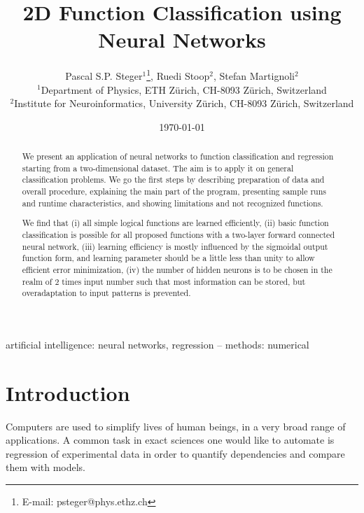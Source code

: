 \documentclass[useAMS,usenatbib]{templates/mn2e}
\begin{document}
%
\title[2D Function Classification using Neural Networks]
       {2D Function Classification using Neural Networks}
%
\author[P. Steger et al.]{Pascal S.P. Steger$^{1}$\thanks{E-mail: psteger@phys.ethz.ch},
  Ruedi Stoop$^{2}$,
  Stefan Martignoli$^{2}$\\
  $^{1}$Department of Physics,
  ETH Z\"urich,
  CH-8093 Z\"urich,
  Switzerland\\
  $^{2}$Institute for Neuroinformatics,
  University Z\"urich,
  CH-8093 Z\"urich,
  Switzerland
}
%
%
\date{\today}
\pagerange{\pageref{firstpage}--\pageref{lastpage}} 
\maketitle
\label{firstpage}
\begin{abstract}
  We present an application of neural networks to function
  classification and regression starting from a two-dimensional
  dataset. The aim is to apply it on general classification
  problems. We go the first steps by describing preparation of data
  and overall procedure, explaining the main part of the program,
  presenting sample runs and runtime characteristics, and showing
  limitations and not recognized functions.

  We find that (i) all simple logical functions are learned
  efficiently, (ii) basic function classification is possible for all
  proposed functions with a two-layer forward connected neural
  network, (iii) learning efficiency is mostly influenced by the
  sigmoidal output function form, and learning parameter should be a
  little less than unity to allow efficient error minimization, (iv)
  the number of hidden neurons is to be chosen in the realm of 2 times
  input number such that most information can be stored, but
  overadaptation to input patterns is prevented.
\end{abstract}
%
\begin{keywords}
  artificial intelligence: neural networks, regression --
  methods: numerical
\end{keywords}
%
\section{Introduction}
\label{sec:Introduction}
Computers are used to simplify lives of human beings, in a very broad
range of applications. A common task in exact sciences one would like
to automate is regression of experimental data in order to quantify
dependencies and compare them with models.
\end{document}
